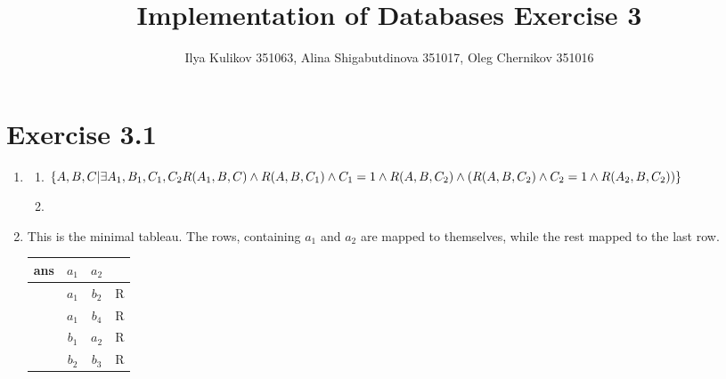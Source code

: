 \documentclass[10pt]{article}
\title{Implementation of Databases Exercise 3}
\author{Ilya Kulikov 351063, Alina Shigabutdinova 351017, Oleg Chernikov 351016}
\begin{document}
  \maketitle

  \section*{Exercise 3.1}
  \begin{enumerate}[label=\arabic*.]
    \item
      \begin{enumerate}[label=\alph*.]
          \item
          $\{A,B,C | \exists A_1, B_1, C_1, C_2\\
          R(A_1,B,C) \wedge\\
          R(A,B,C_1) \wedge\\
          C_1=1 \wedge R(A,B,C_2) \wedge (R(A,B,C_2) \wedge C_2=1 \wedge R(A_2,B,C_2))\}$
          \item
      \end{enumerate}
    \item
    This is the minimal tableau. The rows, containing $a_1$ and $a_2$ are mapped to themselves, while the rest mapped to the last row.\\
    	\begin{tabular}{ c | c | c | c}
			ans & $a_1$ & $a_2$ & \\
            \hline
            & $a_1$ & $b_2$ & R \\
            & $a_1$ & $b_4$ & R \\
            & $b_1$ & $a_2$ & R \\
            & $b_2$ & $b_3$ & R \\
            \hline
		\end{tabular}
  \end{enumerate}
\end{document}
